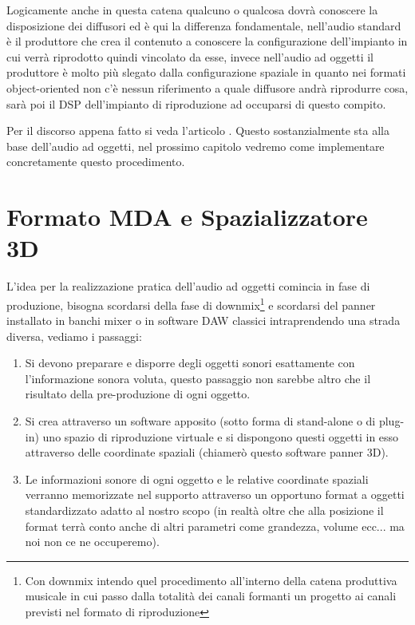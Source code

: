 \documentclass[12pt,a4paper]{report}
\begin{document}
Logicamente anche in questa catena qualcuno o qualcosa dovrà conoscere la disposizione dei diffusori ed è qui la differenza fondamentale, nell'audio standard è il produttore che crea il contenuto a conoscere la configurazione dell'impianto in cui verrà riprodotto quindi vincolato da esse, invece nell'audio ad oggetti il produttore è molto più slegato dalla configurazione spaziale in quanto nei formati object-oriented non c'è nessun riferimento a quale diffusore andrà riprodurre cosa, sarà poi il DSP dell'impianto di riproduzione ad occuparsi di questo compito.

Per il discorso appena fatto si veda l'articolo \cite{object}.
Questo sostanzialmente sta alla base dell'audio ad oggetti, nel prossimo capitolo vedremo come implementare concretamente questo procedimento.

\chapter{Formato MDA e Spazializzatore 3D}\label{dolby}

L'idea per la realizzazione pratica dell'audio ad oggetti comincia in fase di produzione, bisogna scordarsi della fase di downmix\footnote{Con downmix intendo quel procedimento all'interno della catena produttiva musicale in cui passo dalla totalità dei canali formanti un progetto ai canali previsti nel formato di riproduzione} e scordarsi del panner installato in banchi mixer o in software DAW classici intraprendendo una strada diversa, vediamo i passaggi:

 \begin{enumerate}
 
\item Si devono preparare e disporre degli oggetti sonori esattamente con l'informazione sonora voluta, questo passaggio non sarebbe altro che il risultato della pre-produzione di ogni oggetto.
\item Si crea attraverso un software apposito (sotto forma di stand-alone o di plug-in) uno spazio di riproduzione virtuale e si dispongono questi oggetti in esso attraverso delle coordinate spaziali (chiamerò questo software panner 3D).
\item Le informazioni sonore di ogni oggetto e le relative coordinate spaziali verranno memorizzate nel supporto attraverso un opportuno format a oggetti standardizzato adatto al nostro scopo (in realtà oltre che alla posizione il format terrà conto anche di altri parametri come grandezza, volume ecc... ma noi non ce ne occuperemo).
 \end{enumerate}
\end{document}
